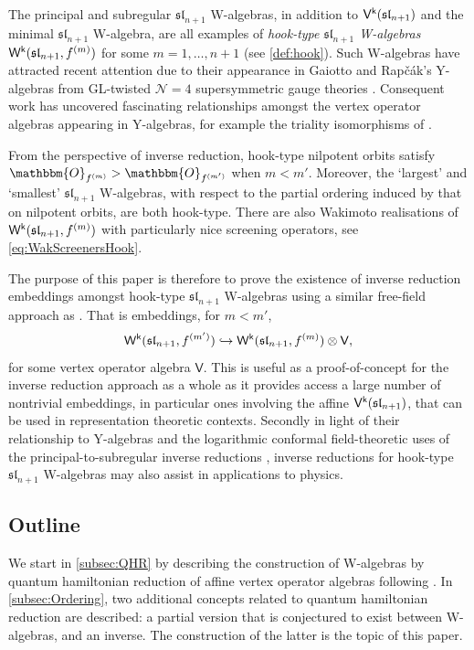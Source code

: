 \documentclass[10pt,a4paper]{amsart}
\numberwithin{equation}{section}
\newcommand{\kk}{\mathsf{k}}   %
\DeclarePairedDelimiter{\brac}{\lparen}{\rparen}   %
\newcommand{\alg}[1]{\mathfrak{#1}}  %
\newcommand{\VOA}[1]{\mathsf{#1}}    %
\newcommand{\SLA}[2]{\alg{#1}_{#2}}                      %
\newcommand{\slnpone}{\SLA{sl}{n+1}}
\newcommand{\nilorbit}[1]{\mathbbm{O}_{#1}}                                                 %
\newcommand{\fhook}[1]{f^{(#1)}}                                  %
\newcommand{\Wsymb}{\VOA{W}}
\newcommand{\uaffvoa}[2]{\VOA{V}^{#1}\brac{#2}}                   %
\newcommand{\uQHR}[3]{\Wsymb^{#1}\brac{#2,#3}}                    %
\theoremstyle{plain}
\begin{document}
The principal and subregular $\slnpone$ W-algebras, in addition to $\uaffvoa{\kk}{\slnpone}$ and the minimal $\slnpone$ W-algebra, are all examples of \emph{hook-type $\slnpone$ W-algebras} $\uQHR{\kk}{\slnpone}{\fhook{m}}$ for some $m=1,\dots,n+1$ (see \cref{def:hook}). Such W-algebras have attracted recent attention due to their appearance in Gaiotto and Rap\v c\' ak's Y-algebras from GL-twisted $\mathcal{N}=4$ supersymmetric gauge theories \cite{Gai19}. Consequent work has uncovered fascinating relationships amongst the vertex operator algebras appearing in Y-algebras, for example the triality isomorphisms of \cite{CreTri22}.

From the perspective of inverse reduction, hook-type nilpotent orbits satisfy $\nilorbit{f^{(m)}} > \nilorbit{f^{(m')}}$ when $m < m'$. Moreover, the `largest' and `smallest' $\slnpone$ W-algebras, with respect to the partial ordering induced by that on nilpotent orbits, are both hook-type. There are also Wakimoto realisations of $\uQHR{\kk}{\slnpone}{\fhook{m}}$ with particularly nice screening operators, see \eqref{eq:WakScreenersHook}.

The purpose of this paper is therefore to prove the existence of inverse reduction embeddings amongst hook-type $\slnpone$ W-algebras using a similar free-field approach as \cite{Feh21c}. That is embeddings, for $m<m'$, 
%
\begin{equation}
    \uQHR{\kk}{\slnpone}{\fhook{m'}} \hookrightarrow \uQHR{\kk}{\slnpone}{\fhook{m}} \otimes \VOA{V},
\end{equation}
%
for some vertex operator algebra $\VOA{V}$. This is useful as a proof-of-concept for the inverse reduction approach as a whole as it provides access a large number of nontrivial embeddings, in particular ones involving the affine $\uaffvoa{\kk}{\slnpone}$, that can be used in representation theoretic contexts. Secondly in light of their relationship to Y-algebras and the logarithmic conformal field-theoretic uses of the principal-to-subregular inverse reductions \cite{CreMod13,Feh21b,Feh21c}, inverse reductions for hook-type $\slnpone$ W-algebras may also assist in applications to physics.


\subsection{Outline}
We start in \cref{subsec:QHR} by describing the construction of W-algebras by quantum hamiltonian reduction of affine vertex operator algebras following \cite{KacQua03,KacQua04}. In \cref{subsec:Ordering}, two additional concepts related to quantum hamiltonian reduction are described: a partial version that is conjectured to exist between W-algebras, and an inverse. The construction of the latter is the topic of this paper.
\end{document}
